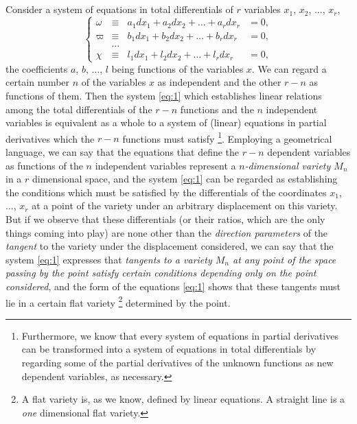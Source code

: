 \documentclass[leqno,11pt]{book}
\theoremstyle{shape1}
\theoremstyle{shapesmall}
\newcommand{\vp}{\varpi}
\begin{document}
\section{}
\label{sec:1}

Consider a system of equations in total differentials of $r$ variables $x_{1}$, $x_{2}$, $\dots$, $x_{r}$,
\begin{equation}
  \label{eq:1}
  \left\{
    \begin{alignedat}{3}
      \omega&\equiv& a_{1}dx_{1}+a_{2}dx_{2}+\dots+a_{r}dx_{r}&{}={}0,\\
      \vp&\equiv& b_{1}dx_{1}+b_{2}dx_{2}+\dots+b_{r}dx_{r}&=0,\\
      &\dots\\
      \chi&\equiv& l_{1}dx_{1}+l_{2}dx_{2}+\dots+l_{r}dx_{r}&=0,
    \end{alignedat}
  \right.
\end{equation}
the coefficients $a$, $b$, $\dots$, $l$ being functions of the variables $x$. We can regard a certain number $n$ of the variables $x$ as independent and the other $r-n$ as functions of them. Then the system \eqref{eq:1} which establishes linear relations among the total differentials of the $r-n$ functions and the $n$ independent variables is equivalent as a whole to a system of (linear) equations in partial derivatives which the $r-n$ functions must satisfy \footnote{Furthermore, we know that every system of equations in partial derivatives can be transformed into a system of equations in total differentials by regarding some of the partial derivatives of the unknown functions as new dependent variables, as necessary.}. Employing a geometrical language, we can say that the equations that define the $r-n$ dependent variables as functions of the $n$ independent variables represent a \emph{$n$-dimensional variety $M_{n}$} in a $r$ dimensional space, and the system \eqref{eq:1} can be regarded as establishing the conditions which must be satisfied by the differentials of the coordinates $x_{1}$, $\dots$, $x_{r}$ at a point of the variety under an arbitrary displacement on this variety. But if we observe that these differentials (or their ratios, which are the only things coming into play) are none other than the \emph{direction parameters} of the \emph{tangent} to the variety under the displacement considered, we can say that the system \eqref{eq:1} expresses that \emph{tangents to a variety $M_{n}$ at any point of the space passing by the point satisfy certain conditions depending only on the point considered}, and the form of the equations \eqref{eq:1} shows that these tangents must lie in a certain flat variety \footnote{A flat variety is, as we know, defined by linear equations. A straight line is a \emph{one} dimensional flat variety.} determined by the point.
\end{document}
